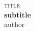 
\begin{titlepage}
	\renewcommand*{\thepage}{frontpage}
		\centering
		{\scshape \Huge {title}}\\
		\vspace{2cm}
		{\huge \textbf{subtitle}}\\
		\vspace{3cm}
		\vfill
		author
\end{titlepage}

